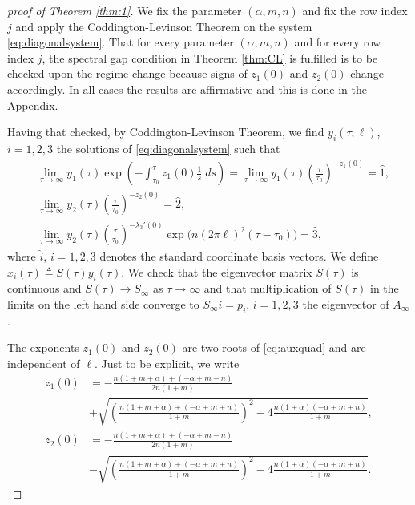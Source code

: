 \documentclass[a4paper,11pt]{article}
\def\l{(2\pi \ell)}
\theoremstyle{remark}
\begin{document}
\begin{proof}[proof of Theorem \ref{thm:1}]
We fix the parameter $(\alpha,m,n)$ and fix the row index $j$ and apply the Coddington-Levinson Theorem on the system \eqref{eq:diagonalsystem}. That for every parameter $(\alpha,m,n)$ and for every row index $j$, the spectral gap condition in Theorem \ref{thm:CL} is fulfilled is to be checked upon the regime change because signs of $z_1(0)$ and $z_2(0)$ change accordingly. In all cases the results are affirmative and this is done in the Appendix.

Having that checked, by Coddington-Levinson Theorem, we find $y_i(\tau;\ell)$, $i=1,2,3$ the solutions of \eqref{eq:diagonalsystem} such that
 \begin{align*}
 &\lim_{\tau \rightarrow \infty} y_1(\tau) \exp\left(-\int_{\tau_0}^\tau z_1(0)\frac{1}{s}\; ds\right) = \lim_{\tau \rightarrow \infty} y_1(\tau)\left(\frac{\tau}{\tau_0}\right)^{-z_1(0)} = \hat{1}, \\
 &\lim_{\tau \rightarrow \infty} y_2(\tau)\left(\frac{\tau}{\tau_0}\right)^{-z_2(0)} = \hat{2}, \\
 &\lim_{\tau \rightarrow \infty} y_2(\tau)\left(\frac{\tau}{\tau_0}\right)^{-\lambda_3'(0)}\exp\Big(n\l^2(\tau-\tau_0)\Big) = \hat{3},
 \end{align*}
 where $\hat{i}$, $i=1,2,3$ denotes the standard coordinate basis vectors. We define $x_i(\tau)\triangleq S(\tau)y_i(\tau)$. We check that the eigenvector matrix $S(\tau)$ is continuous and $S(\tau) \rightarrow S_\infty$ as $\tau \rightarrow \infty$ and that multiplication of $S(\tau)$ in the limits on the left hand side converge to $S_\infty \hat{i}=p_i$, $i=1,2,3$ the eigenvector of $A_\infty$.
 
 The exponents $z_1(0)$ and $z_2(0)$ are two roots of \eqref{eq:auxquad} and are independent of $\ell$. Just to be explicit, we write
\begin{align*}
 z_1(0) &= -\frac{n(1+m+\alpha) + (-\alpha+m+n)}{2n(1+m)} \\
 &+ \sqrt{\left(\frac{n(1+m+\alpha) + (-\alpha+m+n)}{1+m}\right)^2 -4 \frac{n(1+\alpha)(-\alpha+m+n)}{1+m}},\\
 z_2(0) &= -\frac{n(1+m+\alpha) + (-\alpha+m+n)}{2n(1+m)} \\
 &- \sqrt{\left(\frac{n(1+m+\alpha) + (-\alpha+m+n)}{1+m}\right)^2 -4 \frac{n(1+\alpha)(-\alpha+m+n)}{1+m}}.
\end{align*} 
 

\end{proof}
\end{document}
